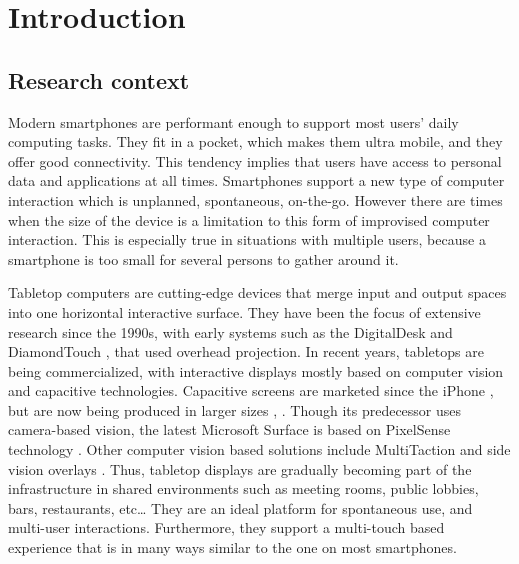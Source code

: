 

%

\chapter{Introduction}
\label{introduction}

\section{Research context}

Modern smartphones are performant enough to support most users' daily computing tasks.
They fit in a pocket, which makes them ultra mobile, and they offer good connectivity.
This tendency implies that users have access to personal data and applications at all times.
Smartphones support a new type of computer interaction which is unplanned, spontaneous, on-the-go.
However there are times when the size of the device is a limitation to this form of improvised computer interaction.
This is especially true in situations with multiple users, because a smartphone is too small for several persons to gather around it.

Tabletop computers are cutting-edge devices that merge input and output spaces into one horizontal interactive surface.
They have been the focus of extensive research since the 1990s, with early systems such as the DigitalDesk \citep{Wellner:1993:digitaldesk} and DiamondTouch \citep{Dietz:2001:diamondtouch}, that used overhead projection.
In recent years, tabletops are being commercialized, with interactive displays mostly based on computer vision and capacitive technologies.
Capacitive screens are marketed since the iPhone \citep{iphone}, but are now being produced in larger sizes \citep{displax}, \citep{3m}.
Though its predecessor uses camera-based vision, the latest Microsoft Surface \citep{ms} is based on PixelSense technology \citep{pixelsense}.
Other computer vision based solutions include MultiTaction \citep{multitouch} and side vision overlays \citep{pq}.
Thus, tabletop displays are gradually becoming part of the infrastructure in shared environments such as meeting rooms, public lobbies, bars, restaurants, etc\ldots
They are an ideal platform for spontaneous use, and multi-user interactions.
Furthermore, they support a multi-touch based experience that is in many ways similar to the one on most smartphones.

